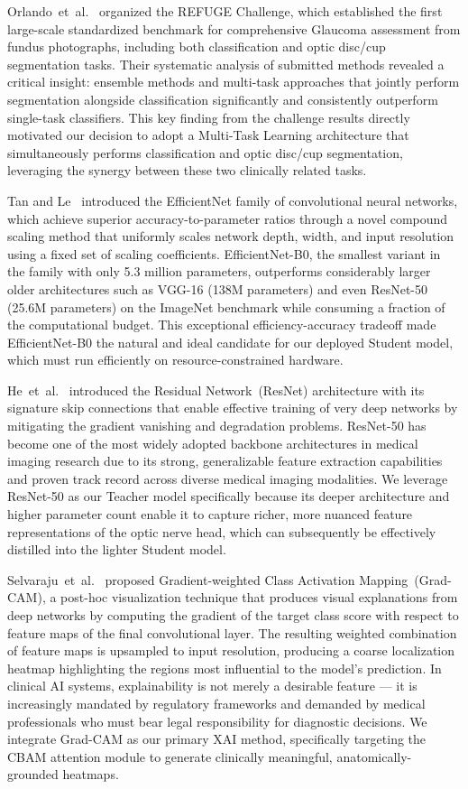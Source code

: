 \documentclass[conference]{IEEEtran}
\begin{document}
Orlando~et~al.~\cite{orlando2020} organized the REFUGE Challenge, which established the first large-scale standardized benchmark for comprehensive Glaucoma assessment from fundus photographs, including both classification and optic disc/cup segmentation tasks. Their systematic analysis of submitted methods revealed a critical insight: ensemble methods and multi-task approaches that jointly perform segmentation alongside classification significantly and consistently outperform single-task classifiers. This key finding from the challenge results directly motivated our decision to adopt a Multi-Task Learning architecture that simultaneously performs classification and optic disc/cup segmentation, leveraging the synergy between these two clinically related tasks.

Tan and Le~\cite{tan2019} introduced the EfficientNet family of convolutional neural networks, which achieve superior accuracy-to-parameter ratios through a novel compound scaling method that uniformly scales network depth, width, and input resolution using a fixed set of scaling coefficients. EfficientNet-B0, the smallest variant in the family with only 5.3 million parameters, outperforms considerably larger older architectures such as VGG-16 (138M parameters) and even ResNet-50 (25.6M parameters) on the ImageNet benchmark while consuming a fraction of the computational budget. This exceptional efficiency-accuracy tradeoff made EfficientNet-B0 the natural and ideal candidate for our deployed Student model, which must run efficiently on resource-constrained hardware.

He~et~al.~\cite{he2016} introduced the Residual Network~(ResNet) architecture with its signature skip connections that enable effective training of very deep networks by mitigating the gradient vanishing and degradation problems. ResNet-50 has become one of the most widely adopted backbone architectures in medical imaging research due to its strong, generalizable feature extraction capabilities and proven track record across diverse medical imaging modalities. We leverage ResNet-50 as our Teacher model specifically because its deeper architecture and higher parameter count enable it to capture richer, more nuanced feature representations of the optic nerve head, which can subsequently be effectively distilled into the lighter Student model.

Selvaraju~et~al.~\cite{selvaraju2017} proposed Gradient-weighted Class Activation Mapping~(Grad-CAM), a post-hoc visualization technique that produces visual explanations from deep networks by computing the gradient of the target class score with respect to feature maps of the final convolutional layer. The resulting weighted combination of feature maps is upsampled to input resolution, producing a coarse localization heatmap highlighting the regions most influential to the model's prediction. In clinical AI systems, explainability is not merely a desirable feature --- it is increasingly mandated by regulatory frameworks and demanded by medical professionals who must bear legal responsibility for diagnostic decisions. We integrate Grad-CAM as our primary XAI method, specifically targeting the CBAM attention module to generate clinically meaningful, anatomically-grounded heatmaps.
\end{document}
